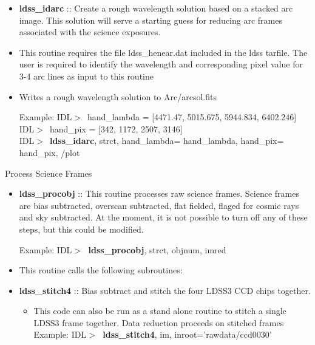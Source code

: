 \documentclass[11pt,letterpaper,dvips]{article}
\begin{document}
\begin{enumerate}
	\begin{itemize}
	  \item {\bf ldss\_idarc} :: Create a rough wavelength
           solution based on a stacked arc image.  This solution will
           serve a starting guess for reducing arc frames associated with
           the science exposures.

	  \item This routine requires the file ldss\_henear.dat
	    included in the ldss tarfile.  The user is required to
	    identify the wavelength and corresponding pixel value for
	    3-4 arc lines as input to this routine

	  \item Writes a rough wavelength solution to Arc/arcsol.fits

         \quad Example: IDL$> \,$  hand_lambda = [4471.47, 5015.675, 5944.834, 6402.246]\\ 
	                IDL$> \,$  hand_pix    = [342,     1172,     2507,      3146]\\
			IDL$> \,$ {\bf ldss\_idarc}, strct, hand\_lambda= hand\_lambda, hand\_pix= hand\_pix, /plot \\

	\end{itemize}



{\Large \bf \item Process Science Frames }

	\begin{itemize}
	\item {\bf ldss\_procobj} :: This routine processes raw
	  science frames.  Science frames are bias subtracted,
	  overscan subtracted, flat fielded, flaged for cosmic rays
	  and sky subtracted.  At the moment, it is not possible to
	  turn off any of these steps, but this could be modified.

         \quad Example: IDL$> \;$ {\bf ldss\_procobj}, strct, objnum, imred \\

	 \item This routine calls the following subroutines:

	\item {\bf ldss\_stitch4} :: Bias subtract and stitch the four LDSS3
	  CCD chips together.
	    \begin{itemize}
	      \item This code can also be run as a stand alone routine
                 to stitch a single LDSS3 frame together.  Data
                 reduction proceeds on stitched frames
		 \quad Example: IDL$> \;$ {\bf ldss\_stitch4}, im, inroot='rawdata/ccd0030'
	    \end{itemize}


\end{itemize}
\end{enumerate}
\end{document}
